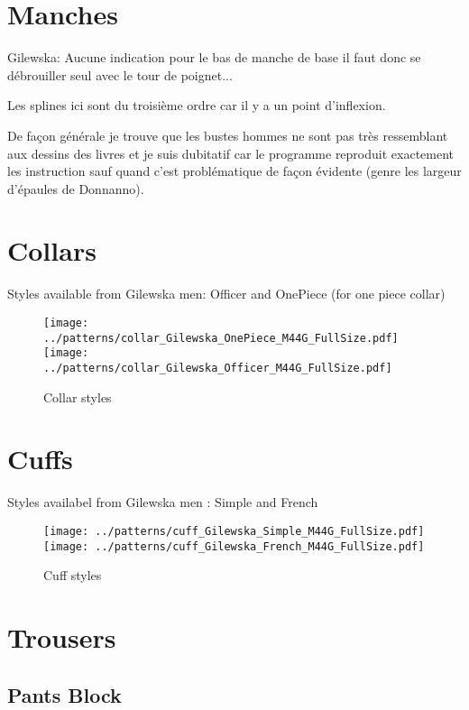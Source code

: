 \documentclass[10pt,a4paper,twoside]{report}
\begin{document}
\section{Manches}
Gilewska: Aucune indication pour le bas de manche de base il faut donc
se débrouiller seul avec le tour de poignet...

Les splines ici sont du troisième ordre car il y a un point d'inflexion.


De façon générale je trouve que les bustes hommes ne sont pas très ressemblant aux dessins des livres et je suis dubitatif car le programme reproduit exactement les instruction sauf quand c'est problématique de façon évidente (genre les largeur d'épaules de Donnanno).


\section{Collars}
Styles available from Gilewska men: Officer and OnePiece (for one piece collar)

\begin{figure}
\begin{center}
\texttt{[image: ../patterns/collar\_Gilewska\_OnePiece\_M44G\_FullSize.pdf]}
\texttt{[image: ../patterns/collar\_Gilewska\_Officer\_M44G\_FullSize.pdf]}
\end{center}
\caption{Collar styles}
\end{figure}


\section{Cuffs}
Styles availabel from Gilewska men : Simple and French

\begin{figure}
\begin{center}
\texttt{[image: ../patterns/cuff\_Gilewska\_Simple\_M44G\_FullSize.pdf]}
\texttt{[image: ../patterns/cuff\_Gilewska\_French\_M44G\_FullSize.pdf]}
\end{center}
\caption{Cuff styles}
\end{figure}

\section{Trousers}


\subsection{Pants Block}
\end{document}
